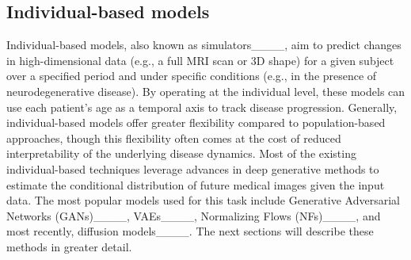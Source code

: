 \subsection{Individual-based models}
Individual-based models, also known as simulators____, aim to predict changes in high-dimensional data (e.g., a full MRI scan or 3D shape) for a given subject over a specified period and under specific conditions (e.g., in the presence of neurodegenerative disease). By operating at the individual level, these models can use each patient’s age as a temporal axis to track disease progression. Generally, individual-based models offer greater flexibility compared to population-based approaches, though this flexibility often comes at the cost of reduced interpretability of the underlying disease dynamics. Most of the existing individual-based techniques leverage advances in deep generative methods to estimate the conditional distribution of future medical images given the input data. The most popular models used for this task include Generative Adversarial Networks (GANs)____, VAEs____, Normalizing Flows (NFs)____, and most recently, diffusion models____. The next sections will describe these methods in greater detail.


